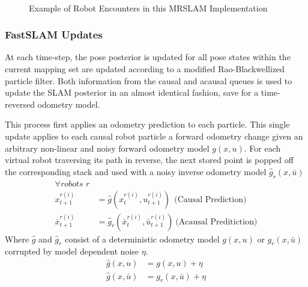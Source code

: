 \begin{figure}[ht!]
     \\
\caption{Example of Robot Encounters in this MRSLAM Implementation}
\label{fig:multiencounter}
\end{figure}

\vspace{0.1in}
\subsubsection{FastSLAM Updates}
At each time-step, the pose posterior is updated for all pose states within the current mapping set are updated according to a modified Rao-Blackwellized particle filter. Both information from the causal and acausal queues is used to update the SLAM posterior in an almost identical fashion, save for a time-reversed odometry model. 

This process first applies an odometry prediction to each particle. This single update applies to each causal robot particle a forward odometry change given an arbitrary non-linear and noisy forward odometry model $g(x,u)$. For each virtual robot traversing its path in reverse, the next stored point is popped off the corresponding stack and used with a noisy inverse odometry model $\hat{g}_r(x,\bar{u})$
\begin{align*}
\forall \textit{robots $r$} \\
x_{t+1}^{r(i)} &= \hat{g}(x_{t}^{r(i)},u_{t+1}^{r(i)})~~\text{(Causal Prediction)}\\
\bar{x}_{t+1}^{r(i)} &= \hat{g}_r(\bar{x}_t^{r(i)}, \bar{u}_{t+1}^{r(i)}) ~\text{(Acausal Preditiction)}
\end{align*}
Where $\hat{g}$ and $\hat{g}_r$ consist of a deterministic odometry model $g(x,u)$ or $g_r(x,\bar{u})$ corrupted by model dependent noise $\eta$.
\begin{align}
\hat{g}(x,u)&=g(x,u)+\eta\\
\hat{g}(x,\bar{u})&=g_r(x,\bar{u})+\eta
\end{align}

